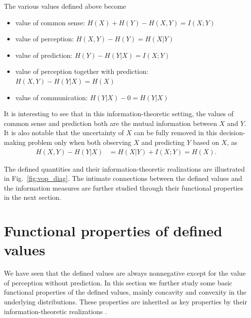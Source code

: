 \documentclass{article}
\begin{document}
The various values defined above become
\begin{itemize}[leftmargin=*]%
\item
value of common sense: \quad
$
  H(X) + H(Y) - H(X,Y) 
 = I(X;Y)
$
\item
value of perception: \quad
$
  H(X,Y) - H(Y)
 = H(X|Y)
$
\item 
value of prediction: \quad
$  
H(Y) - H(Y|X)
 = I(X;Y)
$
\item 
value of perception together with prediction: \quad
$
  H(X,Y) - H(Y|X)
 = H(X)
$
\item 
 value of communication: \quad
$
  H(Y|X) - 0
 = H(Y|X)
$
\end{itemize}
It is interesting to see that in this information-theoretic setting, the values of common sense and prediction both are the mutual information between $X$ and $Y$.
It is also notable that the uncertainty of $X$ can be fully removed in this decision-making problem only when both observing $X$ and predicting $Y$ based on $X$, as
\begin{align}
    H(X,Y) - H(Y|X) &= H(X|Y) + I(X;Y) 
    = H(X) .
\end{align}

The defined quantities and their information-theoretic realizations are illustrated in Fig.~\ref{fig:vop_diag}.
The intimate connections between the defined values and the information measures are further studied through their functional properties in the next section.


\section{Functional properties of defined values}\label{appd:func_prop}
We have seen that the defined values are always nonnegative except for the value of perception without prediction.
In this section we further study some basic functional properties of the defined values, mainly concavity and convexity in the underlying distributions. 
These properties are inherited as key properties by their information-theoretic realizations \cite{it_book_pw}. 
\end{document}
